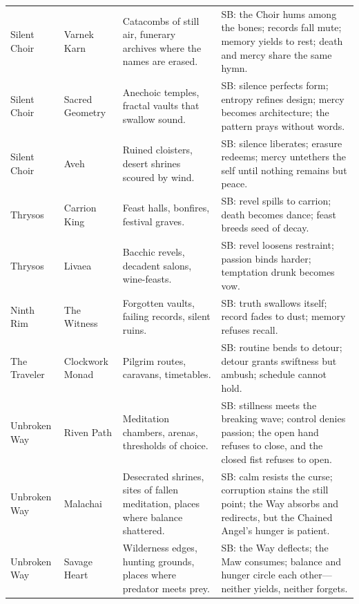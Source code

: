 \begin{longtable}{@{}p{3.3cm}p{3.3cm}p{4.6cm}p{7.2cm}@{}}
  Silent Choir & Varnek Karn &
  Catacombs of still air, funerary archives where the names are erased. &
  SB: the Choir hums among the bones; records fall mute; memory yields to rest; death and mercy share the same hymn. \\

  Silent Choir & Sacred Geometry &
  Anechoic temples, fractal vaults that swallow sound. &
  SB: silence perfects form; entropy refines design; mercy becomes architecture; the pattern prays without words. \\

  Silent Choir & Aveh &
  Ruined cloisters, desert shrines scoured by wind. &
  SB: silence liberates; erasure redeems; mercy untethers the self until nothing remains but peace. \\

  Thrysos & Carrion King &
  Feast halls, bonfires, festival graves. &
  SB: revel spills to carrion; death becomes dance; feast breeds seed of decay. \\

  Thrysos & Livaea &
  Bacchic revels, decadent salons, wine-feasts. &
  SB: revel loosens restraint; passion binds harder; temptation drunk becomes vow. \\

  Ninth Rim & The Witness &
  Forgotten vaults, failing records, silent ruins. &
  SB: truth swallows itself; record fades to dust; memory refuses recall. \\

  The Traveler & Clockwork Monad &
  Pilgrim routes, caravans, timetables. &
  SB: routine bends to detour; detour grants swiftness but ambush; schedule cannot hold. \\

  Unbroken Way & Riven Path &
  Meditation chambers, arenas, thresholds of choice. &
  SB: stillness meets the breaking wave; control denies passion; the open hand refuses to close, and the closed fist refuses to open. \\

  Unbroken Way & Malachai &
  Desecrated shrines, sites of fallen meditation, places where balance shattered. &
  SB: calm resists the curse; corruption stains the still point; the Way absorbs and redirects, but the Chained Angel's hunger is patient. \\

  Unbroken Way & Savage Heart &
  Wilderness edges, hunting grounds, places where predator meets prey. &
  SB: the Way deflects; the Maw consumes; balance and hunger circle each other---neither yields, neither forgets. \\


\end{longtable}
